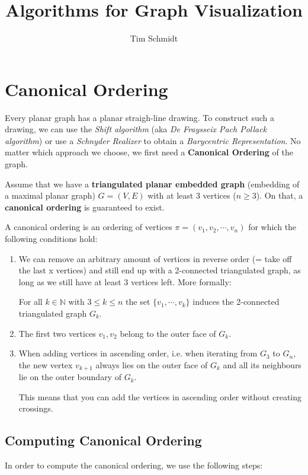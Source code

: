 \documentclass[10pt,a4paper]{article}
\author{Tim Schmidt}
\title{Algorithms for Graph Visualization}
\begin{document}
	{\let\newpage\relax\maketitle}
	\tableofcontents
	\newpage
	\setcounter{page}{1}

\section{Canonical Ordering}
Every planar graph has a planar straigh-line drawing.
To construct such a drawing, we can use the \textit{Shift
algorithm} (aka \textit{De Fraysseix Pach Pollack algorithm}) or use a
\textit{Schnyder Realizer} to obtain a \textit{Barycentric Representation}.
No matter which approach we choose, we first need a \textbf{Canonical Ordering}
of the graph.

Assume that we have a \textbf{triangulated planar embedded graph} (embedding
of a maximal planar graph) $G = (V,E)$ with at least 3 vertices ($n \geq 3$).
On that, a \textbf{canonical ordering} is guaranteed to exist.

A canonical ordering is an ordering of vertices $\pi = (v_1, v_2, \cdots, v_n)$
for which the following conditions hold:

\begin{enumerate}
    \item We can remove an arbitrary amount of vertices in reverse order (=
        take off the last x vertices) and still end up with a 2-connected
        triangulated graph, as long as we still have at least 3 vertices left.
        More formally:

        For all $k \in \mathbb{N}$ with $3 \leq k \leq n$ the set $\{v_1,
        \cdots, v_k\}$ induces the 2-connected triangulated graph $G_k$.

    \item The first two vertices $v_1, v_2$ belong to the outer face of $G_k$.

    \item When adding vertices in ascending order, i.e. when iterating from
        $G_3$ to $G_n$, the new vertex $v_{k+1}$ always lies on the outer face
        of $G_k$ and all its neighbours lie on the outer boundary of $G_k$.

        This means that you can add the vertices in ascending order without
        creating crossings.
\end{enumerate}

\subsection{Computing Canonical Ordering}
In order to compute the canonical ordering, we use the following steps:
\end{document}
